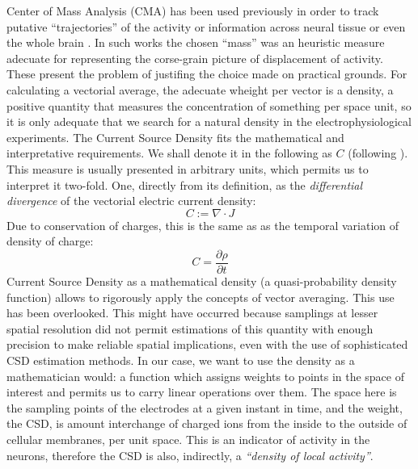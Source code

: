 \documentclass{article}
\begin{document}
Center of Mass Analysis (CMA) has been used previously in order to track putative  ``trajectories'' of the activity or information across neural tissue or even the whole brain \cite{Chao05, Chao07, Manjarrez07, Manjarrez09}. In such works the chosen ``mass'' was an heuristic measure adecuate for representing the corse-grain picture of displacement of activity. These present the problem of justifing the choice made on practical grounds. For calculating a vectorial average, the adecuate wheight per vector is a density, a positive quantity that measures the concentration of something per space unit, so it is only adequate that we search for a natural density in the electrophysiological experiments. The Current Source Density fits the mathematical and interpretative requirements. We shall denote it in the following as $C$ (following \cite{Potworowski2011}).  This measure is usually presented in arbitrary units, which permits us to interpret it two-fold. One, directly from its definition, as the \emph{differential divergence} of the vectorial electric current density:
\begin{equation}
  C:=\nabla \cdot J
\end{equation}
Due to conservation of charges, this is the same as as the temporal variation of density of charge:
\begin{equation}
  C=\frac{\partial \rho}{\partial t}
\end{equation}
Current Source Density as a mathematical density (a quasi-probability density function)  allows  to rigorously apply the concepts of vector averaging. This use has been overlooked. This might have occurred because  samplings at lesser spatial resolution did not permit estimations of this quantity with enough precision to make reliable spatial implications, even with the use of sophisticated CSD estimation methods. In our case, we want to use the density as a mathematician would: a function which assigns weights to points in the space of interest and permits us to carry linear operations over them.  The space here is the sampling points of the electrodes at a given instant in time, and the weight, the CSD, is amount interchange of charged ions from the inside to the outside of cellular membranes, per unit space.  This is an indicator of activity in the neurons, therefore the CSD is also, indirectly, a \emph{``density of local activity''}.
\end{document}
